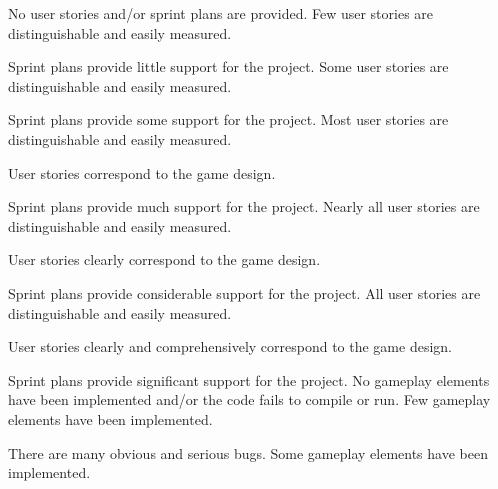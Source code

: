 \documentclass{../fal_assignment}
\begin{document}
\begin{markingrubric}
%
        \grade\fail No user stories and/or sprint plans are provided.
        \grade Few user stories are distinguishable and easily measured.
            \par Sprint plans provide little support for the project.
        \grade Some user stories are distinguishable and easily measured.
            \par Sprint plans provide some support for the project.
        \grade Most user stories are distinguishable and easily measured.
            \par User stories correspond to the game design.
            \par Sprint plans provide much support for the project.
        \grade Nearly all user stories are distinguishable and easily measured.
            \par User stories clearly correspond to the game design.
            \par Sprint plans provide considerable support for the project.
        \grade All user stories are distinguishable and easily measured.
            \par User stories clearly and comprehensively correspond to the game design.
            \par Sprint plans provide significant support for the project.
%
        \grade\fail No gameplay elements have been implemented and/or the code fails to compile or run.
        \grade Few gameplay elements have been implemented.
            \par There are many obvious and serious bugs.
        \grade Some gameplay elements have been implemented.

\end{markingrubric}
\end{document}
